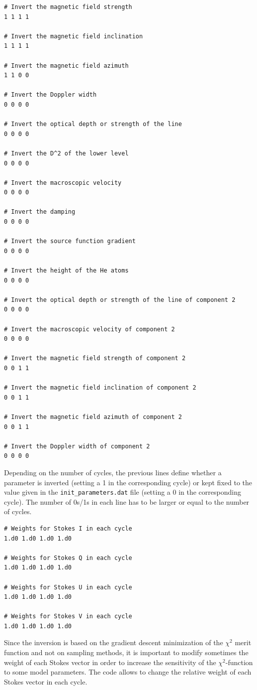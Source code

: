 \documentclass[12pt]{article}
\begin{document}
\begin{verbatim}
# Invert the magnetic field strength
1 1 1 1

# Invert the magnetic field inclination
1 1 1 1

# Invert the magnetic field azimuth
1 1 0 0

# Invert the Doppler width
0 0 0 0

# Invert the optical depth or strength of the line
0 0 0 0

# Invert the D^2 of the lower level
0 0 0 0

# Invert the macroscopic velocity
0 0 0 0

# Invert the damping
0 0 0 0

# Invert the source function gradient
0 0 0 0

# Invert the height of the He atoms
0 0 0 0

# Invert the optical depth or strength of the line of component 2
0 0 0 0

# Invert the macroscopic velocity of component 2
0 0 0 0

# Invert the magnetic field strength of component 2
0 0 1 1

# Invert the magnetic field inclination of component 2
0 0 1 1

# Invert the magnetic field azimuth of component 2
0 0 1 1

# Invert the Doppler width of component 2
0 0 0 0
\end{verbatim}
Depending on the number of cycles, the previous lines define whether a parameter is inverted (setting a 1 in the
corresponding cycle) or kept fixed to the value given in the \texttt{init\_parameters.dat} file (setting a 0
in the corresponding cycle). The number of 0s/1s in each line has to be larger or equal to the number of cycles.

\begin{verbatim}
# Weights for Stokes I in each cycle
1.d0 1.d0 1.d0 1.d0

# Weights for Stokes Q in each cycle
1.d0 1.d0 1.d0 1.d0

# Weights for Stokes U in each cycle
1.d0 1.d0 1.d0 1.d0

# Weights for Stokes V in each cycle
1.d0 1.d0 1.d0 1.d0
\end{verbatim}
Since the inversion is based on the gradient descent minimization of the $\chi^2$ merit function and not on
sampling methods, it is important to modify sometimes the weight of each Stokes vector in order to
increase the sensitivity of the $\chi^2$-function to some model parameters. The code allows to change the relative
weight of each Stokes vector in each cycle.
\end{document}
